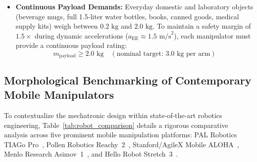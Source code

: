 \begin{itemize}[leftmargin=1.5em]
  \item \textbf{Continuous Payload Demands:} Everyday domestic and laboratory objects (beverage mugs, full 1.5-liter water bottles, books, canned goods, medical supply kits) weigh between $0.2\text{ kg}$ and $2.0\text{ kg}$. To maintain a safety margin of $1.5\times$ during dynamic accelerations ($a_{\text{EE}} \approx 1.5\text{ m/s}^2$), each manipulator must provide a continuous payload rating:
  \begin{equation}
  m_{\text{payload}} \ge 2.0\text{ kg} \quad (\text{nominal target: } 3.0\text{ kg per arm})
  \end{equation}
\end{itemize}

\subsection{Morphological Benchmarking of Contemporary Mobile Manipulators}
To contextualize the mechatronic design within state-of-the-art robotics engineering, Table~\ref{tab:robot_comparison} details a rigorous comparative analysis across five prominent mobile manipulation platforms: PAL Robotics TIAGo Pro~\cite{tiagopro}, Pollen Robotics Reachy~2~\cite{reachy2}, Stanford/AgileX Mobile ALOHA~\cite{mobilealoha}, Menlo Research Asimov~1~\cite{asimov1}, and Hello Robot Stretch~3~\cite{stretch}.

